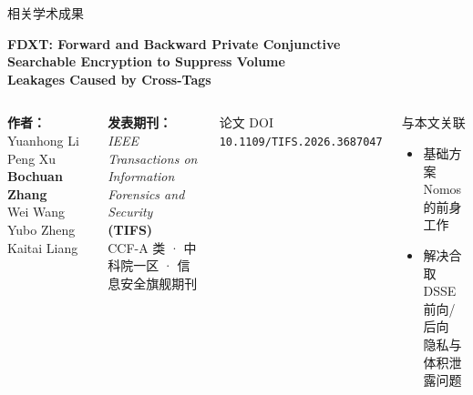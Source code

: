 \begin{frame}{相关学术成果}


  \vspace{-0.4em}

  \begin{block}{}
    \vspace{0.15em}
    {\large\bfseries
      FDXT: Forward and Backward Private Conjunctive\\
      Searchable Encryption to Suppress Volume\\
      Leakages Caused by Cross-Tags}
    \vspace{0.35em}
  \end{block}

  \vspace{0.3em}

  \begin{columns}[T]
      \textbf{作者：}\\[0.3em]
      Yuanhong Li \quad Peng Xu \quad
      \textcolor{BFHd}{\textbf{Bochuan Zhang}}\\
      Wei Wang \quad Yubo Zheng \quad Kaitai Liang

      \vspace{0.6em}
      \textbf{发表期刊：}\\[0.2em]
      \textit{IEEE Transactions on Information}\\
      \textit{Forensics and Security} \textbf{(TIFS)}\\[0.3em]
      \small CCF-A 类 · 中科院一区 · 信息安全旗舰期刊

      \begin{exampleblock}{论文 DOI}
        \centering\small
        \texttt{10.1109/TIFS.2026.3687047}
      \end{exampleblock}

      \vspace{0.4em}
      \begin{block}{与本文关联}
        \small
        \begin{itemize}[noitemsep, topsep=1pt]
          \item 基础方案 Nomos 的前身工作
          \item 解决合取 DSSE 前向/后向\\
                隐私与体积泄露问题
        \end{itemize}
      \end{block}
  \end{columns}

\end{frame}

